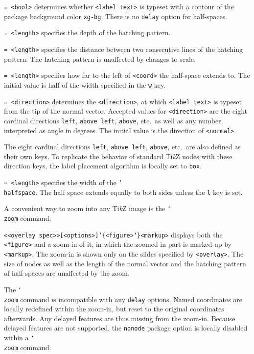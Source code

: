 \documentclass{article}
\newenvironment{desc}{\itemize[leftmargin=50pt]}{\enditemize}
\def\macroarg#1#2{\item[\cmd{#1}] \hskip-2.5pt\texttt{#2}}
\def\option#1#2{\item[\texttt{#1}] \hskip-1.5pt\texttt{#2}}
\renewcommand{\textbackslash}{\char`\\}
\def\cmd#1{\texttt{\color{cmd}\textbackslash#1}}
\def\leftbrace{\char`\{}
\def\rightbrace{\char`\}}
\def\arg#1{{\color{cmd}\leftbrace}{\color{black}#1}{\color{cmd}\rightbrace}}
\def\optarg[#1]{{\color{player1}[#1]}}
\def\TikZ{Ti\emph{k}Z\xspace}
\begin{document}
\begin{desc}
\option{contour}{= <bool>} determines whether \texttt{<label text>} is typeset with a contour of the package background color \texttt{xg-bg}. There is no \texttt{delay} option for half-spaces.
\option{depth}{= <length>} specifies the depth of the hatching pattern.
\option{hatch}{= <length>} specifies the distance between two consecutive lines of the hatching pattern. The hatching pattern is unaffected by changes to scale. 
\option{l}{= <length>} specifies how far to the left of \texttt{<coord>} the half-space extends to. The initial value is half of the width specified in the \texttt{w} key.
\option{label}{= <direction>} determines the \texttt{<direction>}, at which \texttt{<label text>} is typeset from the tip of the normal vector. Accepted values for \texttt{<direction>} are the eight cardinal directions \texttt{left}, \texttt{above left}, \texttt{above}, etc.\ as well as any number, interpreted as angle in degrees. The initial value is the direction of \texttt{<normal>}.

{\color{player3} The eight cardinal directions \texttt{left}, \texttt{above left}, \texttt{above}, etc.\ are also defined as their own keys. To replicate the behavior of standard \TikZ nodes with these direction keys, the label placement algorithm is locally set to \texttt{box}.}

\option{w}{= <length>} specifies the width of the \cmd{halfspace}. The half space extends equally to both sides unless the \texttt{l} key is set.
\end{desc}

A convenient way to zoom into any \TikZ image is the \cmd{zoom} command.

\begin{desc}
\macroarg{zoom}{<<overlay spec>>\optarg[<options>]\arg{<figure>}{<markup>}} displays both the \texttt{<figure>} and a zoom-in of it, in which the zoomed-in part is marked up by \texttt{<markup>}. The zoom-in is shown only on the slides specified by \texttt{<overlay>}. The size of nodes as well as the length of the normal vector and the hatching pattern of half spaces are unaffected by the zoom.

{\color{player4}The \cmd{zoom} command is incompatible with any \texttt{delay} options. Named coordinates are locally redefined within the zoom-in, but reset to the original coordinates afterwards. Any delayed features are thus missing from the zoom-in. Because delayed features are not supported, the \texttt{nonode} package option is locally disabled within a \cmd{zoom} command.
%
}
\end{desc}
\end{document}
